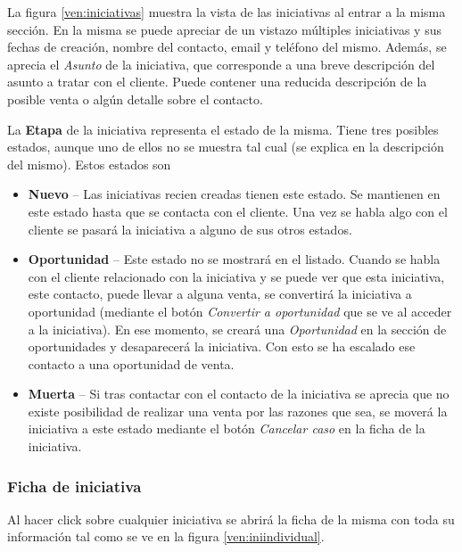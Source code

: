 La figura \ref{ven:iniciativas} muestra la vista de las iniciativas al entrar a la misma sección. En la misma se puede apreciar de un
vistazo múltiples iniciativas y sus fechas de creación, nombre del contacto, email y teléfono del mismo. Además, se aprecia el \emph{Asunto} de la 
iniciativa, que corresponde a una breve descripción del asunto a tratar con el cliente. Puede contener una reducida descripción de la posible
venta o algún detalle sobre el contacto.

La \textbf{Etapa} de la iniciativa representa el estado de la misma. Tiene tres posibles estados, aunque uno de ellos no se muestra tal cual (se explica en la descripción del mismo). Estos estados son

\begin{itemize}
  \item \textbf{Nuevo} -- Las iniciativas recien creadas tienen este estado. Se mantienen en este estado hasta que se contacta con el 
                          cliente. Una vez se habla algo con el cliente se pasará la iniciativa a alguno de sus otros estados.
  \item \textbf{Oportunidad} -- Este estado no se mostrará en el listado. Cuando se habla con el cliente relacionado con la iniciativa
                y se puede ver que esta iniciativa, este contacto, puede llevar a alguna venta, se convertirá la iniciativa a oportunidad (mediante el botón \emph{Convertir a oportunidad} que se ve al acceder a la iniciativa).
                En ese momento, se creará una \emph{Oportunidad} en la sección de oportunidades y desaparecerá la iniciativa. Con 
                esto se ha escalado ese contacto a una oportunidad de venta.
  \item  \textbf{Muerta} -- Si tras contactar con el contacto de la iniciativa se aprecia que no existe posibilidad de realizar una venta
               por las razones que sea, se moverá la iniciativa a este estado mediante el botón \emph{Cancelar caso} en la ficha de la 
               iniciativa.
\end{itemize}



\subsubsection{Ficha de iniciativa}

Al hacer click sobre cualquier iniciativa se abrirá la ficha de la misma con toda su información tal como se ve en la figura 
\ref{ven:iniindividual}.

